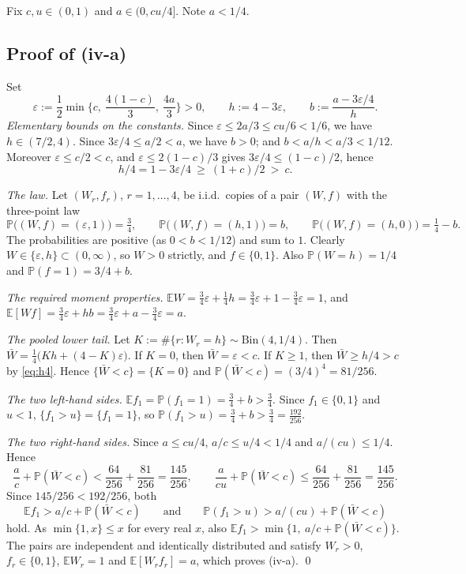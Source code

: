 \documentclass[11pt]{article}
\theoremstyle{remark}
\begin{document}
Fix $c,u\in(0,1)$ and $a\in(0,cu/4]$. Note $a<1/4$.

\subsection{Proof of (iv-a)}
Set
\[
  \varepsilon:=\frac12\min\Big\{c,\ \frac{4(1-c)}3,\ \frac{4a}3\Big\}>0,\qquad
  h:=4-3\varepsilon,\qquad
  b:=\frac{a-3\varepsilon/4}{h}.
\]
\emph{Elementary bounds on the constants.} Since $\varepsilon\le 2a/3\le cu/6<1/6$, we have $h\in(7/2,4)$. Since
$3\varepsilon/4\le a/2<a$, we have $b>0$; and $b<a/h<a/3<1/12$. Moreover $\varepsilon\le c/2<c$, and
$\varepsilon\le 2(1-c)/3$ gives $3\varepsilon/4\le(1-c)/2$, hence
\begin{equation}\label{eq:h4}
  h/4=1-3\varepsilon/4\ \ge\ (1+c)/2\ >\ c .
\end{equation}

\emph{The law.} Let $(W_r,f_r)$, $r=1,\dots,4$, be i.i.d.\ copies of a pair $(W,f)$ with the three-point law
\[
  \mathbb P\big((W,f)=(\varepsilon,1)\big)=\tfrac34,\qquad
  \mathbb P\big((W,f)=(h,1)\big)=b,\qquad
  \mathbb P\big((W,f)=(h,0)\big)=\tfrac14-b .
\]
The probabilities are positive (as $0<b<1/12$) and sum to $1$. Clearly $W\in\{\varepsilon,h\}\subset(0,\infty)$, so
$W>0$ strictly, and $f\in\{0,1\}$. Also $\mathbb P(W=h)=1/4$ and $\mathbb P(f=1)=3/4+b$.

\emph{The required moment properties.}
$\mathbb E W=\tfrac34\varepsilon+\tfrac14h=\tfrac34\varepsilon+1-\tfrac34\varepsilon=1$, and
$\mathbb E[Wf]=\tfrac34\varepsilon+hb=\tfrac34\varepsilon+a-\tfrac34\varepsilon=a$.

\emph{The pooled lower tail.} Let $K:=\#\{r:W_r=h\}\sim\mathrm{Bin}(4,1/4)$. Then
$\bar W=\tfrac14\big(Kh+(4-K)\varepsilon\big)$. If $K=0$, then $\bar W=\varepsilon<c$. If $K\ge1$, then
$\bar W\ge h/4>c$ by \eqref{eq:h4}. Hence $\{\bar W<c\}=\{K=0\}$ and $\mathbb P(\bar W<c)=(3/4)^4=81/256$.

\emph{The two left-hand sides.} $\mathbb E f_1=\mathbb P(f_1=1)=\tfrac34+b>\tfrac34$. Since $f_1\in\{0,1\}$ and
$u<1$, $\{f_1>u\}=\{f_1=1\}$, so $\mathbb P(f_1>u)=\tfrac34+b>\tfrac34=\tfrac{192}{256}$.

\emph{The two right-hand sides.} Since $a\le cu/4$, $a/c\le u/4<1/4$ and $a/(cu)\le1/4$. Hence
\[
  \frac ac+\mathbb P(\bar W<c)<\frac{64}{256}+\frac{81}{256}=\frac{145}{256},\qquad
  \frac a{cu}+\mathbb P(\bar W<c)\le\frac{64}{256}+\frac{81}{256}=\frac{145}{256}.
\]
Since $145/256<192/256$, both
\[
  \mathbb E f_1> a/c+\mathbb P(\bar W<c)\qquad\text{and}\qquad \mathbb P(f_1>u)>a/(cu)+\mathbb P(\bar W<c)
\]
hold. As $\min\{1,x\}\le x$ for every real $x$, also $\mathbb E f_1>\min\{1,\ a/c+\mathbb P(\bar W<c)\}$. The pairs are
independent and identically distributed and satisfy $W_r>0$, $f_r\in\{0,1\}$, $\mathbb E W_r=1$ and
$\mathbb E[W_rf_r]=a$, which proves (iv-a). \qed
\end{document}
